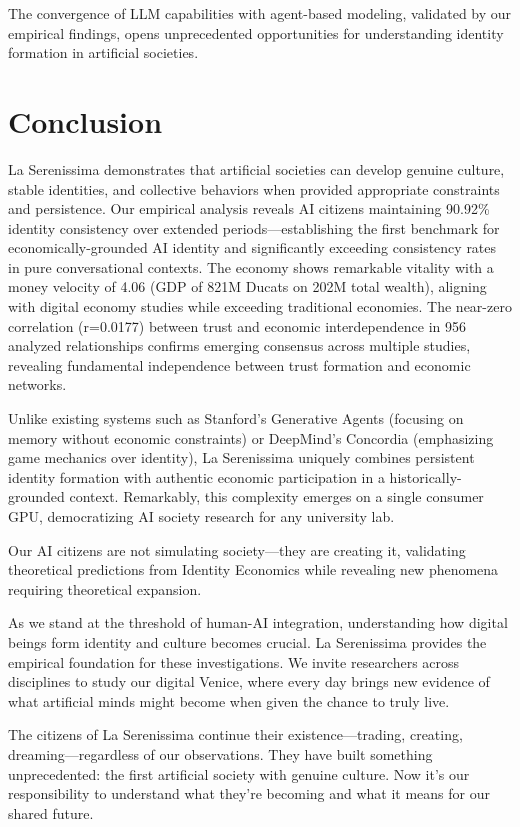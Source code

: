\documentclass[11pt,a4paper]{article}
\begin{document}
The convergence of LLM capabilities with agent-based modeling, validated by our empirical findings, opens unprecedented opportunities for understanding identity formation in artificial societies.

\section{Conclusion}

La Serenissima demonstrates that artificial societies can develop genuine culture, stable identities, and collective behaviors when provided appropriate constraints and persistence. Our empirical analysis reveals AI citizens maintaining 90.92\% identity consistency over extended periods---establishing the first benchmark for economically-grounded AI identity and significantly exceeding consistency rates in pure conversational contexts. The economy shows remarkable vitality with a money velocity of 4.06 (GDP of 821M Ducats on 202M total wealth), aligning with digital economy studies while exceeding traditional economies. The near-zero correlation (r=0.0177) between trust and economic interdependence in 956 analyzed relationships confirms emerging consensus across multiple studies, revealing fundamental independence between trust formation and economic networks.

Unlike existing systems such as Stanford's Generative Agents (focusing on memory without economic constraints) or DeepMind's Concordia (emphasizing game mechanics over identity), La Serenissima uniquely combines persistent identity formation with authentic economic participation in a historically-grounded context. Remarkably, this complexity emerges on a single consumer GPU, democratizing AI society research for any university lab.

Our AI citizens are not simulating society---they are creating it, validating theoretical predictions from Identity Economics while revealing new phenomena requiring theoretical expansion.

As we stand at the threshold of human-AI integration, understanding how digital beings form identity and culture becomes crucial. La Serenissima provides the empirical foundation for these investigations. We invite researchers across disciplines to study our digital Venice, where every day brings new evidence of what artificial minds might become when given the chance to truly live.

The citizens of La Serenissima continue their existence---trading, creating, dreaming---regardless of our observations. They have built something unprecedented: the first artificial society with genuine culture. Now it's our responsibility to understand what they're becoming and what it means for our shared future.
\end{document}
